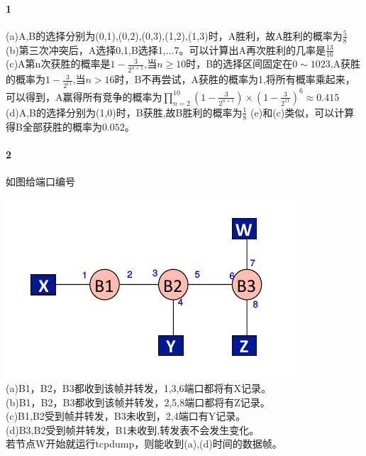 \documentclass[11pt,a4paper]{ctexart}
\title{\vspace{-5ex}}
\author{基科32 曾柯又 2013012266}
\date{\vspace{-5ex}}
\begin{document}
\maketitle
\paragraph{1}
(a)A,B的选择分别为(0,1),(0,2),(0,3),(1,2),(1,3)时，A胜利，故A胜利的概率为$\frac{5}{8}$\\
(b)第三次冲突后，A选择0,1,B选择1,...7。可以计算出A再次胜利的几率是$\frac{13}{16}$\\
(c)A第n次获胜的概率是$ 1 - \frac{3}{2^{n+1}}$,当$n \geq 10 $时，B的选择区间固定在$0\sim1023$,A获胜的概率为$1 - \frac{3}{2^{11}}$,当$n > 16$时，B不再尝试，A获胜的概率为1,将所有概率乘起来，可以得到，A赢得所有竞争的概率为$\prod_{n = 2}^{10}(1 - \frac{3}{2^{n+1}})\times(1 - \frac{3}{2^{11}})^6 \approx 0.415$\\
(d)A,B的选择分别为(1,0)时，B获胜,故B胜利的概率为$\frac{1}{8}$
(e)和(c)类似，可以计算得B全部获胜的概率为$0.052$。
\paragraph{2}
如图给端口编号\\
\graphicspath{ {/home/cengq/Documents/homework} }
\includegraphics[scale=0.5]{p.png}\\
(a)B1，B2，B3都收到该帧并转发，1,3,6端口都将有X记录。\\
(b)B1，B2，B3都收到该帧并转发，2,5,8端口都将有Z记录。\\
(c)B1,B2受到帧并转发，B3未收到，2,4端口有Y记录。\\
(d)B3,B2受到帧并转发，B1未收到,转发表不会发生变化。\\
若节点W开始就运行tcpdump，则能收到(a),(d)时间的数据帧。
\end{document}
